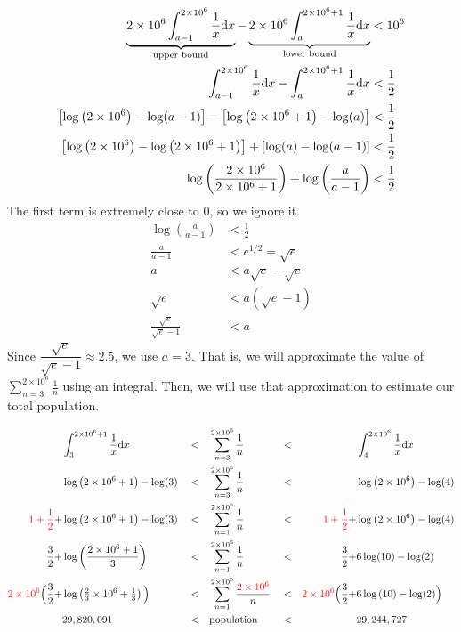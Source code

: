 \begin{solution}
	\begin{align*}
	\underbrace{2\times 10^6\int_{a-1}^{2\times 10^6} \frac{1}{x}\mathrm{d}x}_{\text{upper bound}} -
	\underbrace{2\times 10^6\int_{a}^{2\times 10^6+1} \frac{1}{x}\mathrm{d}x}_{\text{lower bound}} &<10^6\\
\int_{a-1}^{2\times 10^6} \frac{1}{x}\mathrm{d}x -
	\int_{a}^{2\times 10^6+1} \frac{1}{x}\mathrm{d}x &<\frac{1}{2}\\
	\left[\log\left(2\times 10^6 \right)-\log(a-1)\right]-\left[\log\left(2\times 10^6+1 \right)-\log(a)\right]&<\frac12\\
	\left[\log\left(2\times 10^6 \right)-\log\left(2\times 10^6+1 \right)\right]+\left[ \log(a)-\log(a-1)\right]&<\frac12\\
	\log\left(\frac{2\times 10^6}{2\times 10^6+1} \right)+
	\log\left(\frac{a}{a-1} \right)&<\frac{1}{2}
	\end{align*}
	The first term is extremely close to 0, so we ignore it.
	\begin{align*}
	\log\left(\frac{a}{a-1} \right)&<\frac{1}{2}\\
	\frac{a}{a-1}&<e^{1/2}=\sqrt{e}\\
	a&<a\sqrt{e}-\sqrt{e}\\
	\sqrt{e}&<a(\sqrt{e}-1)\\
	\frac{\sqrt{e}}{\sqrt{e}-1}&<a
	\end{align*}
	Since $\dfrac{\sqrt{e}}{\sqrt{e}-1} \approx 2.5$, we use $a=3$. That is, we will approximate the value of $\displaystyle\sum_{n=3}^{2\times 10^6}\frac{1}{n}$ using an integral. Then, we will use that approximation to estimate our total population.

	\begin{alignat*}{5}
&\int_3^{2\times 10^6+1}\frac{1}{x}\mathrm{d}x&&<&&\sum_{n=3}^{2\times 10^6}\frac{1}{n} &&<&&\int_4^{2\times10^6}\frac{1}{x}\mathrm{d}x\\
&\log\left(2\times 10^6+1\right)-\log(3) &&<&&\sum_{n=3}^{2\times 10^6}\frac{1}{n} &&<&&\log\left(2\times10^6\right)-\log(4)\\
\textcolor{red}{1+\frac12}+&\log\left(2\times 10^6+1\right)-\log(3) &&<&&\sum_{n=\textcolor{red}{1}}^{2\times 10^6}\frac{1}{n} &&<&\textcolor{red}{1+\frac12}+&\log\left(2\times10^6\right)-\log(4)\\
\frac32+ &\log\left(\frac{2\times 10^6+1}{3}\right) &&<&&\sum_{n=1}^{2\times 10^6}\frac{1}{n} &&<&\frac32+&6\log(10)-\log(2)\\
\textcolor{red}{2\times10^6}\Big(\frac32+ &\log\left(\tfrac{2}{3}\times 10^6+\tfrac{1}{3}\right)\Big) &&<&&\sum_{n=1}^{2\times 10^6}\frac{\textcolor{red}{2\times10^6}}{n} &&<&\textcolor{red}{2\times10^6}\Big(\frac32+&6\log\left(10\right)-\log(2)\Big)\\
&29,820,091&&<&&\text{population}&&<&&29,244,727
	\end{alignat*}


\end{solution}
